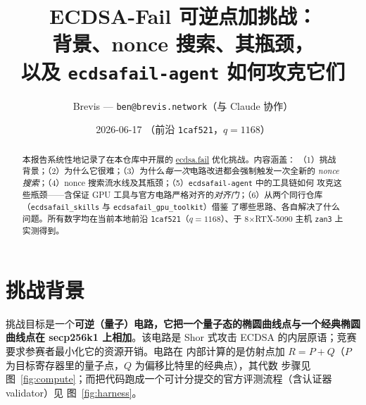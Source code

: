 \documentclass[11pt]{ctexart}
\title{\textbf{ECDSA-Fail 可逆点加挑战：\\
背景、nonce 搜索、其瓶颈，\\ 以及 \texttt{ecdsafail-agent} 如何攻克它们}}
\author{Brevis --- \texttt{ben@brevis.network}（与 Claude 协作）}
\date{2026-06-17 \quad（前沿 \texttt{1caf521}，$q=1168$）}
\begin{document}
\maketitle

\begin{abstract}
本报告系统性地记录了在本仓库中开展的 \href{https://ecdsa.fail}{ecdsa.fail} 优化挑战。内容涵盖：
（1）挑战背景；（2）为什么它很难；（3）为什么\emph{每一次}电路改进都会强制触发一次全新的
\emph{nonce 搜索}；（4）nonce 搜索流水线及其瓶颈；（5）\texttt{ecdsafail-agent} 中的工具链如何
攻克这些瓶颈——含保证 GPU 工具与官方电路严格对齐的\emph{对齐门}；（6）从两个同行仓库（\texttt{ecdsafail\_skills} 与 \texttt{ecdsafail\_gpu\_toolkit}）借鉴
了哪些思路、各自解决了什么问题。所有数字均在当前本地前沿 \texttt{1caf521}（$q=1168$）、于
8$\times$RTX-5090 主机 \texttt{zan3} 上实测得到。
\end{abstract}

\tableofcontents

\section{挑战背景}

挑战目标是一个\textbf{可逆（量子）电路，它把一个量子态的椭圆曲线点与一个经典椭圆曲线点在
secp256k1 上相加}。该电路是 Shor 式攻击 ECDSA 的内层原语；竞赛要求参赛者最小化它的资源开销。电路在
内部计算的是仿射点加 $R = P + Q$（$P$ 为目标寄存器里的量子点，$Q$ 为偏移比特里的经典点），其代数
步骤见图~\ref{fig:compute}；而把代码跑成一个可计分提交的官方评测流程（含认证器 validator）见
图~\ref{fig:harness}。
\end{document}
